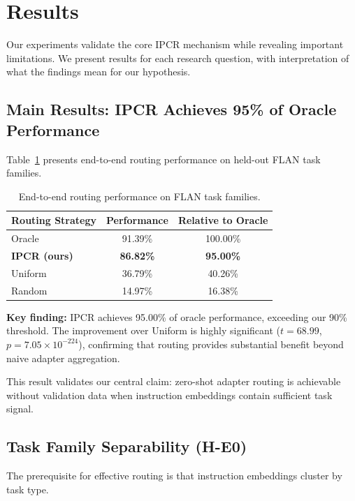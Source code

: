 \section{Results}
\label{sec:results}

Our experiments validate the core IPCR mechanism while revealing important limitations. We present results for each research question, with interpretation of what the findings mean for our hypothesis.

\subsection{Main Results: IPCR Achieves 95\% of Oracle Performance}

Table~\ref{tab:main} presents end-to-end routing performance on held-out FLAN task families.

\begin{table}[h]
\centering
\begin{tabular}{lcc}
\toprule
\textbf{Routing Strategy} & \textbf{Performance} & \textbf{Relative to Oracle} \\
\midrule
Oracle & 91.39\% & 100.00\% \\
\textbf{IPCR (ours)} & \textbf{86.82\%} & \textbf{95.00\%} \\
Uniform & 36.79\% & 40.26\% \\
Random & 14.97\% & 16.38\% \\
\bottomrule
\end{tabular}
\caption{End-to-end routing performance on FLAN task families.}
\label{tab:main}
\end{table}

\textbf{Key finding:} IPCR achieves 95.00\% of oracle performance, exceeding our 90\% threshold. The improvement over Uniform is highly significant ($t = 68.99$, $p = 7.05 \times 10^{-224}$), confirming that routing provides substantial benefit beyond naive adapter aggregation.

This result validates our central claim: zero-shot adapter routing is achievable without validation data when instruction embeddings contain sufficient task signal.

\subsection{Task Family Separability (H-E0)}

The prerequisite for effective routing is that instruction embeddings cluster by task type.

